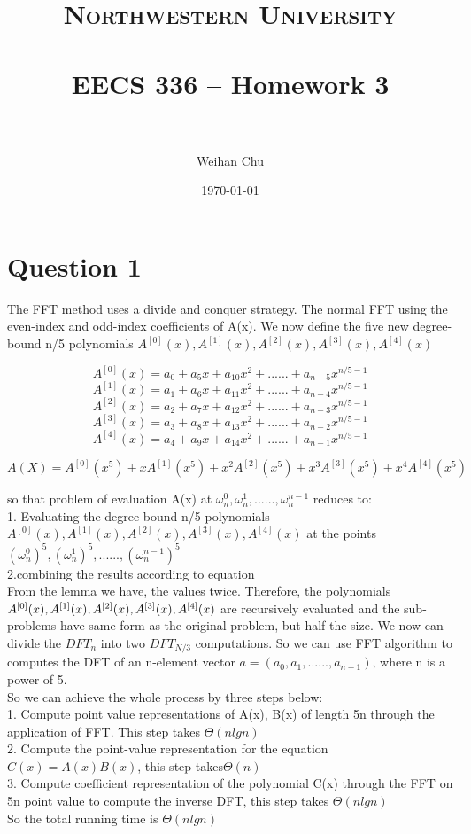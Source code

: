 \documentclass[paper=a4, fontsize=11pt]{scrartcl} %
\title{	
\normalfont \normalsize 
\textsc{Northwestern University} \\ [25pt] %
\horrule{0.5pt} \\[0.4cm] %
\huge EECS 336 -- Homework 3 \\ %
\horrule{2pt} \\[0.5cm] %
}
\author{Weihan Chu} %
\date{\normalsize\today} %
\numberwithin{equation}{section} %
\numberwithin{figure}{section} %
\numberwithin{table}{section} %
\begin{document}
\maketitle %


\section{Question 1}
The FFT method uses a divide and conquer strategy. The normal FFT using the even-index and odd-index coefficients of A(x). We now define the five new degree-bound n/5 polynomials $A^{[0]}(x), A^{[1]}(x), A^{[2]}(x), A^{[3]}(x), A^{[4]}(x)$

$$A^{[0]}(x)=a_0+a_5x+a_{10}x^2+......+a_{n-5}x^{n/5-1} $$
$$A^{[1]}(x)=a_1+a_6x+a_{11}x^2+......+a_{n-4}x^{n/5-1} $$
$$A^{[2]}(x)=a_2+a_7x+a_{12}x^2+......+a_{n-3}x^{n/5-1} $$
$$A^{[3]}(x)=a_3+a_8x+a_{13}x^2+......+a_{n-2}x^{n/5-1} $$
$$A^{[4]}(x)=a_4+a_9x+a_{14}x^2+......+a_{n-1}x^{n/5-1} $$

$$A(X)=A^{[0]}(x^5)+xA^{[1]}(x^5)+x^{2}A^{[2]}(x^5)+x^{3}A^{[3]}(x^5)+x^{4}A^{[4]}(x^5)$$

so that problem of evaluation A(x) at $\omega_n^0,  \omega_n^1,......, \omega_n^{n-1}$ reduces to:\\
1. Evaluating the degree-bound n/5 polynomials $A^{[0]}(x), A^{[1]}(x), A^{[2]}(x), A^{[3]}(x), A^{[4]}(x)$ at the points ${(\omega_n^0)}^5,  {(\omega_n^1)}^5,......, {(\omega_n^{n-1})}^5$\\
2.combining the results according to equation\\
From the lemma we have, the values twice.      Therefore, the polynomials  $A^{[0]}(x), A^{[1]}(x), A^{[2]}(x),\\ A^{[3]}(x), A^{[4]}(x)$ are recursively evaluated and the sub-problems have same form as the original problem, but half the size. We now can divide the $DFT_n$ into two $DFT_{N/3}$ computations. So we can use FFT algorithm to computes the DFT of an n-element vector $a=(a_0, a_1, ......, a_{n-1})$, where n is a power of 5.\\
So we can achieve the whole process by three steps below:\\
1. Compute point value representations of A(x), B(x) of length 5n through the application of FFT. This step takes $\Theta(nlgn)$\\
2. Compute the point-value representation for the equation $C(x)=A(x)B(x)$, this step takes$\Theta(n)$\\
3. Compute  coefficient representation of the polynomial C(x) through the FFT on 5n point value to compute the inverse DFT, this step takes $\Theta(nlgn)$\\
So the total running time is $\Theta(nlgn)$\\
\end{document}
